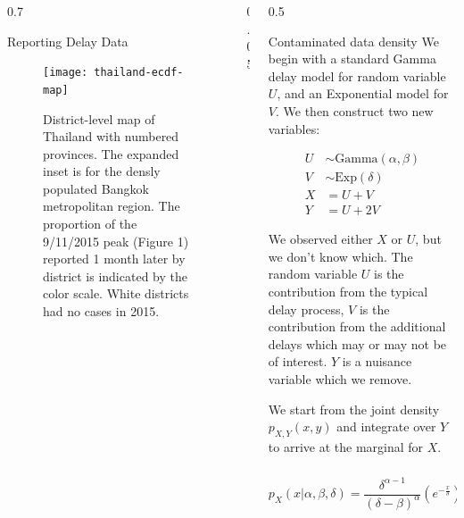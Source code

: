\documentclass[final]{beamer}
\newlength{\onecolwid}
\begin{document}
\begin{frame}[t]
\begin{columns}[t]
\begin{column}{0.7\onecolwid}
\begin{block}{Reporting Delay Data}
\end{block}

\vspace{0.5in}

\begin{figure}
 \begin{center}
    \texttt{[image: thailand-ecdf-map]}
 \end{center}
 \caption{\small District-level map of Thailand with numbered provinces.  The expanded inset is for the densly populated Bangkok metropolitan region.  The proportion of the 9/11/2015 peak (Figure 1) reported 1 month later by district is indicated by the color scale.  White districts had no cases in 2015.}
\end{figure}



\end{column}



\begin{column}{0.05\onecolwid}
\end{column}


\begin{column}{0.5\onecolwid} 

\begin{block}{Contaminated data density}
We begin with a standard Gamma delay model for random variable $U$, and an Exponential model for $V$.  We then construct two new variables:

\begin{align*}
U &\sim \text{Gamma}(\alpha, \beta) \\
V &\sim \text{Exp}(\delta) \\
X &= U + V  \\
Y &= U + 2V
\end{align*}

We observed either $X$ or $U$, but we don't know which.  The random variable $U$ is the contribution from the typical delay process, $V$ is the contribution from the additional delays which may or may not be of interest.  $Y$ is a nuisance variable which we remove.

\vspace{0.2in}
We start from the joint density $p_{X,Y}(x,y)$ and integrate over $Y$ to arrive at the marginal for $X$.      
     
\begin{equation*}
p_X(x|\alpha, \beta, \delta)  = \frac{\delta^{\alpha-1}}{(\delta-\beta)^\alpha} \left(e^{-\frac{x}{\delta}}\right) \frac{\gamma\left(\alpha, \left(\frac{1}{\beta}-\frac{1}{\delta}\right)x\right)}{\Gamma(\alpha)}
\end{equation*}


\end{block}
\end{column}
\end{columns}
\end{frame}
\end{document}

